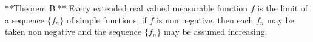 **Theorem B.** Every extended real valued measurable function $f$ is the limit of a sequence $\{f_n\}$ of simple functions; if $f$ is non negative, then each $f_n$ may be taken non negative and the sequence $\{f_n\}$ may be assumed increasing.
